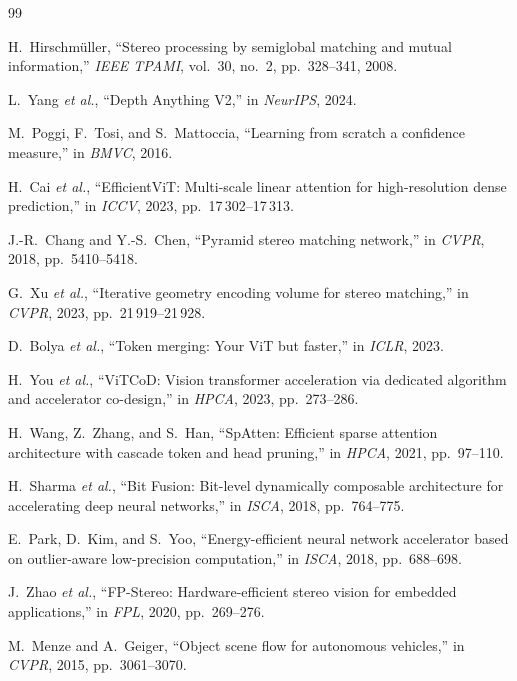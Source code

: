 \documentclass[journal,twocolumn]{IEEEtran}
\begin{document}
\begin{thebibliography}{99}


H.\ Hirschm\"uller, ``Stereo processing by semiglobal matching and mutual information,'' \textit{IEEE TPAMI}, vol.\ 30, no.\ 2, pp.~328--341, 2008.

L.\ Yang \textit{et al.}, ``Depth Anything V2,'' in \textit{NeurIPS}, 2024.

M.\ Poggi, F.\ Tosi, and S.\ Mattoccia, ``Learning from scratch a confidence measure,'' in \textit{BMVC}, 2016.

H.\ Cai \textit{et al.}, ``EfficientViT: Multi-scale linear attention for high-resolution dense prediction,'' in \textit{ICCV}, 2023, pp.~17\,302--17\,313.

J.-R.\ Chang and Y.-S.\ Chen, ``Pyramid stereo matching network,'' in \textit{CVPR}, 2018, pp.~5410--5418.

G.\ Xu \textit{et al.}, ``Iterative geometry encoding volume for stereo matching,'' in \textit{CVPR}, 2023, pp.~21\,919--21\,928.

D.\ Bolya \textit{et al.}, ``Token merging: Your ViT but faster,'' in \textit{ICLR}, 2023.

H.\ You \textit{et al.}, ``ViTCoD: Vision transformer acceleration via dedicated algorithm and accelerator co-design,'' in \textit{HPCA}, 2023, pp.~273--286.

H.\ Wang, Z.\ Zhang, and S.\ Han, ``SpAtten: Efficient sparse attention architecture with cascade token and head pruning,'' in \textit{HPCA}, 2021, pp.~97--110.

H.\ Sharma \textit{et al.}, ``Bit Fusion: Bit-level dynamically composable architecture for accelerating deep neural networks,'' in \textit{ISCA}, 2018, pp.~764--775.

E.\ Park, D.\ Kim, and S.\ Yoo, ``Energy-efficient neural network accelerator based on outlier-aware low-precision computation,'' in \textit{ISCA}, 2018, pp.~688--698.

J.\ Zhao \textit{et al.}, ``FP-Stereo: Hardware-efficient stereo vision for embedded applications,'' in \textit{FPL}, 2020, pp.~269--276.

M.\ Menze and A.\ Geiger, ``Object scene flow for autonomous vehicles,'' in \textit{CVPR}, 2015, pp.~3061--3070.


\end{thebibliography}
\end{document}
